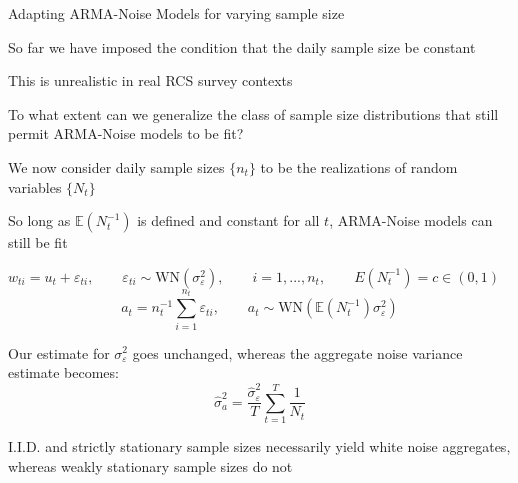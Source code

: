 \documentclass[9pt]{beamer}
\numberwithin{equation}{section}
\theoremstyle{plain}
\begin{document}
\begin{frame}{Adapting ARMA-Noise Models for varying sample size}
\begin{block}{}
{So far we have imposed the condition that the daily sample size be constant}
\end{block}

\begin{block}{}
{This is unrealistic in real RCS survey contexts}
\end{block}

\begin{block}{}
    {To what extent can we generalize the class of sample size distributions that still permit ARMA-Noise models to be fit?}
\end{block}
\begin{block}{}{We now consider daily sample sizes $\{n_t\}$ to be the realizations of random variables $\{N_t\}$}

\end{block}
\end{frame}
\begin{frame}{So long as $\mathbb{E}(N_t^{-1})$ is defined and constant for all $t$, ARMA-Noise models can still be fit}
\vspace{-.1in}

\begin{block}{\centering$w_{ti} = u_t + \varepsilon_{ti}, \qquad \varepsilon_{ti} \sim \text{WN}(\sigma_\varepsilon^2),\qquad i = 1,...,n_t, \qquad E(N_t^{-1}) = c \in (0,1)$
}
\centering
\[ a_t = n_t^{-1}\sum_{i=1}^{n_t}\varepsilon_{ti}, \qquad a_t \sim \text{WN}(\mathbb{E}(N_t^{-1})\sigma_\varepsilon^2) \]
\end{block}

\begin{block}{Our estimate for $\sigma_\varepsilon^2$ goes unchanged, whereas the aggregate noise variance estimate becomes:}
    \centering
    $$ \hat{\sigma}_a^2 = \frac{\hat{\sigma}_\varepsilon^2}{T}\sum_{t=1}^T\frac{1}{N_t} $$
\end{block}

\begin{block}{}
    I.I.D. and strictly stationary sample sizes necessarily yield white noise aggregates, whereas weakly stationary sample sizes do not
\end{block}

\end{frame}
\end{document}
